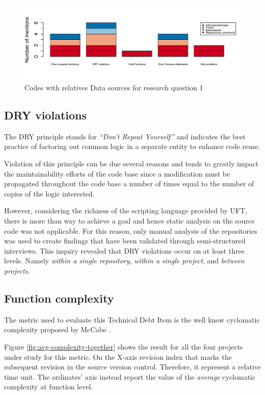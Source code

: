 \begin{figure}[!htbp]
    \centering
    \includegraphics[width=\textwidth,keepaspectratio]{figure/results/rq1/sources.pdf}
    \caption{Codes with relatives Data sources for research question 1}
    \label{fig:rq1_sources}
\end{figure}



\subsection{DRY violations}
    The DRY principle stands for \textit{``Don't Repeat Yourself''} and indicates the best practice of factoring out common logic in a separate entity to enhance code reuse.

    Violation of this principle can be due several reasons and tends to greatly impact the maintainability efforts of the code base since a modification must be propagated throughout the code base a number of times equal to the number of copies of the logic interested.

    However, considering the richness of the scripting language provided by UFT, there is more than way to achieve a goal and hence static analysis on the source code was not applicable. For this reason, only manual analysis of the repositories was used to create findings that have been validated through semi-structured interviews. This inquiry revealed that DRY violations occur on at least three levels. Namely \textit{within a single repository}, \textit{within a single project}, and \textit{between projects}.


\subsection{Function complexity}
    The metric used to evaluate this Technical Debt Item is the well know cyclomatic complexity proposed by McCabe \cite{cyclomatic_complexity}.

    Figure \ref{fig:avg-complexity-together} shows the result for all the four projects under study for this metric. On the X-axis revision index that marks the subsequent revision in the source version control. Therefore, it represent a relative time unit. The ordinates' axis instead report the value of the \textit{average} cyclomatic complexity at function level.

